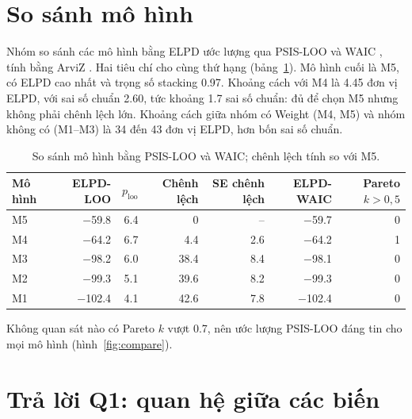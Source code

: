 \documentclass[12pt,a4paper]{report}
\begin{document}

\section{So sánh mô hình}
\label{sec:compare}

Nhóm so sánh các mô hình bằng ELPD ước lượng qua PSIS-LOO và WAIC
\cite{vehtari2017loo}, tính bằng ArviZ \cite{kumar2019arviz}. Hai tiêu chí cho
cùng thứ hạng (bảng~\ref{tab:compare}). Mô hình cuối là M5, có ELPD cao nhất và
trọng số stacking \num{0.97}. Khoảng cách với M4 là \num{4.45} đơn vị ELPD, với
sai số chuẩn \num{2.60}, tức khoảng \num{1.7} sai số chuẩn: đủ để chọn M5 nhưng
không phải chênh lệch lớn. Khoảng cách giữa nhóm có Weight (M4, M5) và nhóm
không có (M1--M3) là 34 đến 43 đơn vị ELPD, hơn bốn sai số chuẩn.

\begin{table}[tp]
  \centering
  \caption{So sánh mô hình bằng PSIS-LOO và WAIC; chênh lệch tính so với M5.}
  \label{tab:compare}
  \begin{tabular}{lrrrrrr}
    \toprule
    Mô hình & ELPD-LOO & $p_{\text{loo}}$ & Chênh lệch & SE chênh lệch & ELPD-WAIC & Pareto $k > 0{,}5$ \\
    \midrule
    M5 & \num{-59.8}  & \num{6.4} & 0           & --         & \num{-59.7}  & 0 \\
    M4 & \num{-64.2}  & \num{6.7} & \num{4.4}   & \num{2.6}  & \num{-64.2}  & 1 \\
    M3 & \num{-98.2}  & \num{6.0} & \num{38.4}  & \num{8.4}  & \num{-98.1}  & 0 \\
    M2 & \num{-99.3}  & \num{5.1} & \num{39.6}  & \num{8.2}  & \num{-99.3}  & 0 \\
    M1 & \num{-102.4} & \num{4.1} & \num{42.6}  & \num{7.8}  & \num{-102.4} & 0 \\
    \bottomrule
  \end{tabular}
\end{table}

Không quan sát nào có Pareto $k$ vượt \num{0.7}, nên ước lượng PSIS-LOO đáng tin
cho mọi mô hình (hình~\ref{fig:compare}).


\section{Trả lời Q1: quan hệ giữa các biến}
\label{sec:q1}
\end{document}

